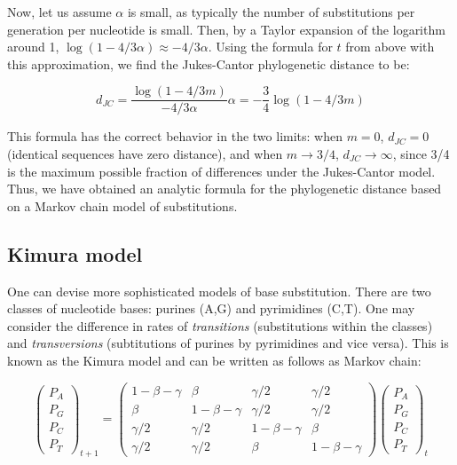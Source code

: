 \documentclass[
  letterpaper,
  DIV=11,
  numbers=noendperiod]{scrreprt}
\begin{document}
Now, let us assume \(\alpha\) is small, as typically the number of
substitutions per generation per nucleotide is small. Then, by a Taylor
expansion of the logarithm around 1,
\(\log (1 -4/3 \alpha) \approx - 4/3\alpha\). Using the formula for
\(t\) from above with this approximation, we find the Jukes-Cantor
phylogenetic distance to be:

\[ 
d_{JC} = \frac{\log (1 - 4/3 m)}{ -4/3 \alpha} \alpha =  -\frac{3}{4}\log (1 - 4/3 m)
\]

This formula has the correct behavior in the two limits: when \(m = 0\),
\(d_{JC} = 0\) (identical sequences have zero distance), and when
\(m \rightarrow 3/4\), \(d_{JC} \rightarrow \infty\), since 3/4 is the
maximum possible fraction of differences under the Jukes-Cantor model.
Thus, we have obtained an analytic formula for the phylogenetic distance
based on a Markov chain model of substitutions.

\subsection{Kimura model}\label{kimura-model}

One can devise more sophisticated models of base substitution. There are
two classes of nucleotide bases: purines (A,G) and pyrimidines (C,T).
One may consider the difference in rates of \emph{transitions}
(substitutions within the classes) and \emph{transversions}
(subtitutions of purines by pyrimidines and vice versa). This is known
as the Kimura model and can be written as follows as Markov chain:

\[   
\left(\begin{array}{c} P_A \\ P_G \\ P_C \\ P_T \end{array}\right)_{t+1}  = \left(\begin{array}{cccc}1-\beta-\gamma & \beta & \gamma/2 &  \gamma/2 \\ \beta  & 1-\beta-\gamma & \gamma/2 & \gamma/2 \\ \gamma/2 & \gamma/2 & 1-\beta-\gamma& \beta  \\ \gamma/2 &\gamma/2 & \beta  & 1-\beta-\gamma \end{array}\right) \left(\begin{array}{c} P_A \\ P_G \\ P_C \\ P_T \end{array}\right)_t 
\]
\end{document}
